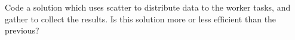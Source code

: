   Code a solution which uses scatter to distribute data to the worker
  tasks, and gather to collect the results. Is this solution more or
  less efficient than the previous?
